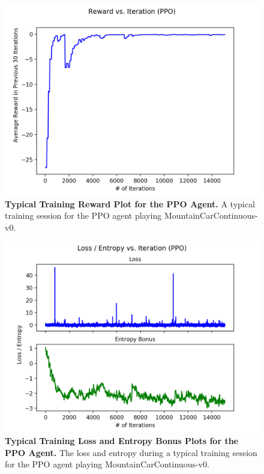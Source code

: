 \documentclass[conference]{IEEEtran}
\begin{document}
\begin{figure}[htbp]
\centerline{\includegraphics[scale=0.5]{PPO_Train_Reward_Plot_MCC_Typical.png}}
\caption{\textbf{Typical Training Reward Plot for the PPO Agent.}  A typical training session for the PPO agent playing MountainCarContinuous-v0.}
\label{fig:PPOTypicalTrainRewardMCC}
\end{figure}

\begin{figure}[htbp]
\centerline{\includegraphics[scale=0.5]{PPO_Train_Loss_Entropy_Plot_MCC_Typical.png}}
\caption{\textbf{Typical Training Loss and Entropy Bonus Plots for the PPO Agent.}  The loss and entropy during a typical training session for the PPO agent playing MountainCarContinuous-v0.}
\label{fig:PPOTypicalTrainLossEntropyMCC}
\end{figure}
\end{document}
